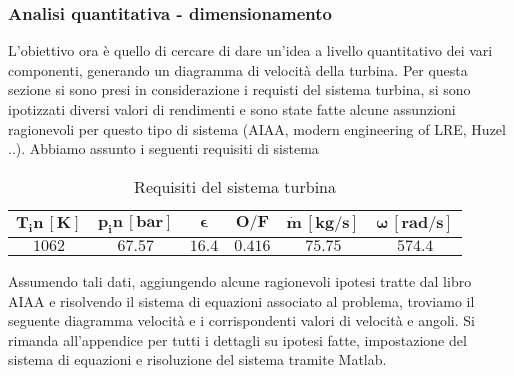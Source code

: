 \subsubsection{Analisi quantitativa - dimensionamento}

L'obiettivo ora è quello di cercare di dare un'idea a livello quantitativo dei vari componenti, generando un diagramma di velocità della turbina. 
Per questa sezione si sono presi in considerazione i requisti del sistema turbina, si sono ipotizzati diversi valori di rendimenti e sono state fatte alcune assunzioni ragionevoli per questo tipo di sistema (AIAA, modern engineering of LRE, Huzel ..). Abbiamo assunto i seguenti requisiti di sistema

\begin{table}[H]

\centering
\begin{tabular}{|c|c|c|c|c|c|}
\hline
$\bm{T_in \, [K]}$ & $\bm{p_in \, [bar]}$ & $\bm{\epsilon}$ &  $\bm{O/F}$ & $\bm{\dot{m} \, [kg/s]}$ & $\bm{\omega \, [rad/s]}$  \\
\hline
$1062$ & $67.57$ & $16.4$ &  $0.416$ & $75.75$ & $574.4$ \\
\hline
\end{tabular}

\caption{Requisiti del sistema turbina}
\label{table:turbine specs}

\end{table}

Assumendo tali dati, aggiungendo alcune ragionevoli ipotesi tratte dal libro AIAA e risolvendo il sistema di equazioni associato al problema, troviamo il seguente diagramma velocità e i corrispondenti valori di velocità e angoli. Si rimanda all'appendice per tutti i dettagli su ipotesi fatte, impostazione del sistema di equazioni e risoluzione del sistema tramite Matlab. 



